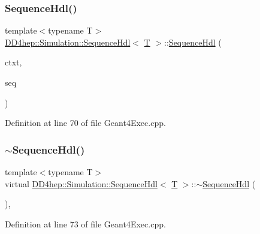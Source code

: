 \subsubsection{\texorpdfstring{Sequence\+Hdl()}{SequenceHdl()}\hspace{0.1cm}{\footnotesize\ttfamily [2/2]}}
{\footnotesize\ttfamily template$<$typename T$>$ \\
\hyperlink{class_d_d4hep_1_1_simulation_1_1_sequence_hdl}{D\+D4hep\+::\+Simulation\+::\+Sequence\+Hdl}$<$ \hyperlink{class_t}{T} $>$\+::\hyperlink{class_d_d4hep_1_1_simulation_1_1_sequence_hdl}{Sequence\+Hdl} (\begin{DoxyParamCaption}\item[{\hyperlink{class_d_d4hep_1_1_simulation_1_1_geant4_context}{Geant4\+Context} $\ast$}]{ctxt,  }\item[{\hyperlink{class_t}{T} $\ast$}]{seq }\end{DoxyParamCaption})\hspace{0.3cm}{\ttfamily [inline]}}



Definition at line 70 of file Geant4\+Exec.\+cpp.

\hypertarget{class_d_d4hep_1_1_simulation_1_1_sequence_hdl_af01dc42f94e773bcd01406fbcc178f4d}{}\label{class_d_d4hep_1_1_simulation_1_1_sequence_hdl_af01dc42f94e773bcd01406fbcc178f4d} 
\subsubsection{\texorpdfstring{$\sim$\+Sequence\+Hdl()}{~SequenceHdl()}}
{\footnotesize\ttfamily template$<$typename T$>$ \\
virtual \hyperlink{class_d_d4hep_1_1_simulation_1_1_sequence_hdl}{D\+D4hep\+::\+Simulation\+::\+Sequence\+Hdl}$<$ \hyperlink{class_t}{T} $>$\+::$\sim$\hyperlink{class_d_d4hep_1_1_simulation_1_1_sequence_hdl}{Sequence\+Hdl} (\begin{DoxyParamCaption}{ }\end{DoxyParamCaption})\hspace{0.3cm}{\ttfamily [inline]}, {\ttfamily [virtual]}}



Definition at line 73 of file Geant4\+Exec.\+cpp.



